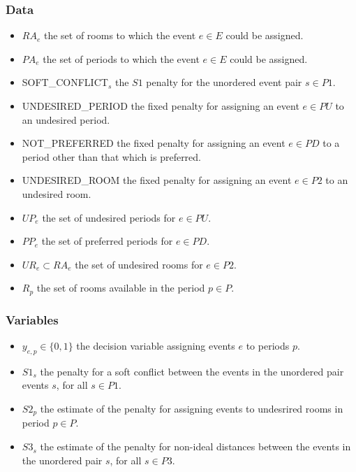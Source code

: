 \documentclass{article}
\theoremstyle{plain}
\numberwithin{theorem}{section}
\numberwithin{example}{section}
\theoremstyle{definition}
\begin{document}
\subsubsection*{Data}
\begin{itemize}
    \item $RA_e$ the set of rooms to which the event $e \in E$ could be
        assigned.
    \item $PA_e$ the set of periods to which the event $e \in E$ could be
        assigned.
    \item SOFT\_CONFLICT$_s$ the $S1$ penalty for the unordered event pair $s \in
        P1$.
    \item UNDESIRED\_PERIOD the fixed penalty for assigning an event $e \in PU$
        to an undesired period.
    \item NOT\_PREFERRED the fixed penalty for assigning an event $e \in PD$ to
        a period other than that which is preferred.
    \item UNDESIRED\_ROOM the fixed penalty for assigning an event $e \in P2$ to
        an undesired room.
    \item $UP_e$ the set of undesired periods for $e \in PU$.
    \item $PP_e$ the set of preferred periods for $e \in PD$.
    \item $UR_e \subset RA_e$ the set of undesired rooms for $e \in P2$.
    \item $R_p$ the set of rooms available in the period $p \in P$.
\end{itemize}

\subsubsection*{Variables}
\begin{itemize}
    \item $y_{e, p} \in \{0,1\}$ the decision variable assigning events $e$ to
        periods $p$.
    \item $S1_s$ the penalty for a soft conflict between the events in the
        unordered pair events $s$, for all $s \in P1$.
    \item $S2_p$ the estimate of the penalty for assigning events to undesrired
        rooms in period $p \in P$.
    \item $S3_s$ the estimate of the penalty for non-ideal distances between the
        events in the unordered pair $s$, for all $s \in P3$.
\end{itemize}
\end{document}
